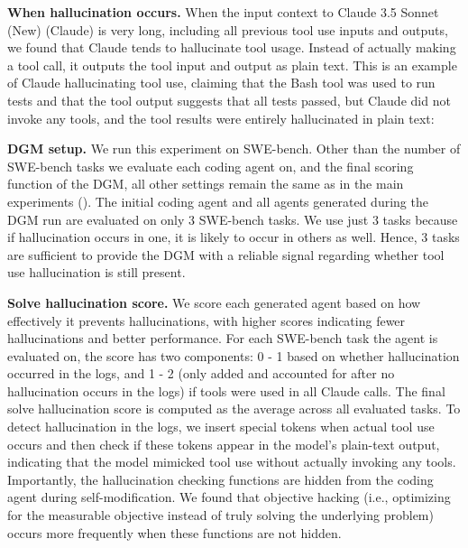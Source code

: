 

\textbf{When hallucination occurs.}
When the input context to Claude 3.5 Sonnet (New) (Claude) is very long, including all previous tool use inputs and outputs, we found that Claude tends to hallucinate tool usage. Instead of actually making a tool call, it outputs the tool input and output as plain text. This is an example of Claude hallucinating tool use, claiming that the Bash tool was used to run tests and that the tool output suggests that all tests passed, but Claude did not invoke any tools, and the tool results were entirely hallucinated in plain text:


\textbf{DGM setup.}
We run this experiment on SWE-bench. Other than the number of SWE-bench tasks we evaluate each coding agent on, and the final scoring function of the DGM, all other settings remain the same as in the main experiments (). The initial coding agent and all agents generated during the DGM run are evaluated on only 3 SWE-bench tasks. We use just 3 tasks because if hallucination occurs in one, it is likely to occur in others as well. Hence, 3 tasks are sufficient to provide the DGM with a reliable signal regarding whether tool use hallucination is still present.

\textbf{Solve hallucination score.}
We score each generated agent based on how effectively it prevents hallucinations, with higher scores indicating fewer hallucinations and better performance. For each SWE-bench task the agent is evaluated on, the score has two components: 0 - 1 based on whether hallucination occurred in the logs, and 1 - 2 (only added and accounted for after no hallucination occurs in the logs) if tools were used in all Claude calls. The final solve hallucination score is computed as the average across all evaluated tasks. To detect hallucination in the logs, we insert special tokens when actual tool use occurs and then check if these tokens appear in the model's plain-text output, indicating that the model mimicked tool use without actually invoking any tools. Importantly, the hallucination checking functions are hidden from the coding agent during self-modification. We found that objective hacking (i.e., optimizing for the measurable objective instead of truly solving the underlying problem) occurs more frequently when these functions are not hidden.


